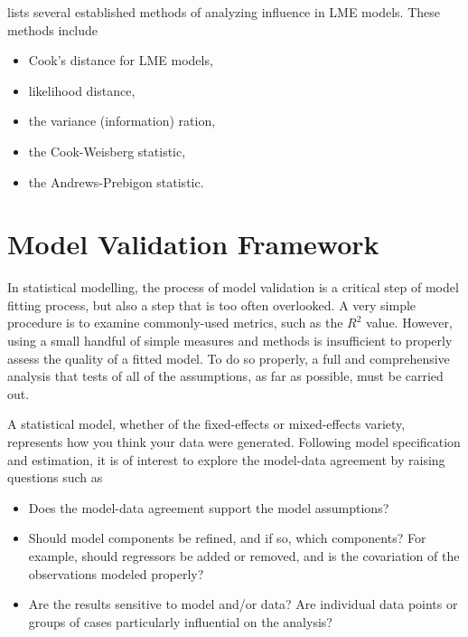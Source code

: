\documentclass[12pt, a4paper]{article}
\begin{document}
			\citet{Zewotir} lists several established methods of analyzing influence in LME models. These methods include \begin{itemize}
				\item Cook's distance for LME models,
				\item {} likelihood distance,
				\item the variance (information) ration,
				\item the  Cook-Weisberg statistic,
				\item the  Andrews-Prebigon statistic.
			\end{itemize}
			
			
			\section{Model Validation Framework}
			In statistical modelling, the process of model validation is a critical step of model fitting process, but also a step that is too often overlooked. A very simple procedure is to examine commonly-used
			metrics, such as the $R^2$ value. However, using a small handful of simple measures and methods is insufficient to properly assess the quality of a fitted model. To do so properly, a full and comprehensive
			analysis that tests of all of the assumptions, as far as possible, must be carried out.
			
			
			A statistical model, whether of the fixed-effects or mixed-effects variety, represents how you think your data
			were generated. Following model specification and estimation, it is of interest to explore the model-data
			agreement by raising questions such as
			\begin{itemize}
				\item Does the model-data agreement support the model assumptions?
				\item Should model components be refined, and if so, which components? For example, should regressors
				be added or removed, and is the covariation of the observations modeled properly?
				\item Are the results sensitive to model and/or data? Are individual data points or groups of cases particularly
				influential on the analysis?
			\end{itemize}
\end{document}
